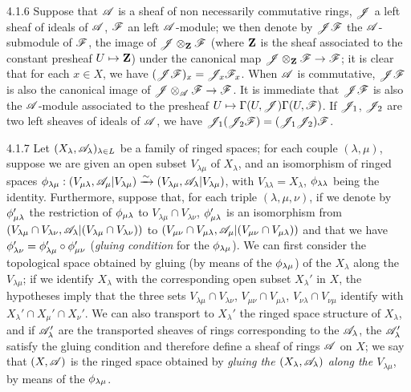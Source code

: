 \begin{env}{4.1.6}
\label{env-0.4.1.6}
Suppose that $\mathscr{A}$ is a sheaf of non necessarily commutative rings, $\mathscr{J}$
a left sheaf of ideals of $\mathscr{A}$, $\mathscr{F}$ an left $\mathscr{A}$-module; we then
denote by $\mathscr{J}\mathscr{F}$ the $\mathscr{A}$-submodule of $\mathscr{F}$, the image of
$\mathscr{J}\otimes_\mathbf{Z}\mathscr{F}$ (where $\mathbf{Z}$ is the sheaf associated to the
constant presheaf $U\mapsto\mathbf{Z}$) under the canonical map
$\mathscr{J}\otimes_\mathbf{Z}\mathscr{F}\to\mathscr{F}$; it is clear that for each $x\in X$, we
have $(\mathscr{J}\mathscr{F})_x=\mathscr{J}_x\mathscr{F}_x$. When $\mathscr{A}$ is commutative,
$\mathscr{J}\mathscr{F}$ is also the canonical image of
$\mathscr{J}\otimes_\mathscr{A}\mathscr{F}\to\mathscr{F}$. It is immediate that $\mathscr{J}\mathscr{F}$ is
also the $\mathscr{A}$-module associated to the presheaf
$U\mapsto\Gamma(U,\mathscr{J})\Gamma(U,\mathscr{F})$. If $\mathscr{J}_1$, $\mathscr{J}_2$ are two
left sheaves of ideals of $\mathscr{A}$, we have
$\mathscr{J}_1(\mathscr{J}_2\mathscr{F})=(\mathscr{J}_1\mathscr{J}_2)\mathscr{F}$.
\end{env}

\begin{env}{4.1.7}
\label{env-0.4.1.7}
Let $(X_\lambda,\mathscr{A}_\lambda)_{\lambda\in L}$ be a family of ringed spaces;
for each couple $(\lambda,\mu)$, suppose we are given an open subset
$V_{\lambda\mu}$ of $X_\lambda$, and an isomorphism of ringed spaces
$\phi_{\lambda\mu}:(V_{\mu\lambda},\mathscr{A}_\mu|V_{\lambda\mu})
  \xrightarrow{\sim}(V_{\lambda\mu},\mathscr{A}_\lambda|V_{\lambda\mu})$, with
$V_{\lambda\lambda}=X_\lambda$, $\phi_{\lambda\lambda}$ being the identity.
Furthermore, suppose that, for each triple $(\lambda,\mu,\nu)$, if we denote by
$\phi_{\mu\lambda}'$ the restriction of $\phi_{\mu\lambda}$ to
$V_{\lambda\mu}\cap V_{\lambda\nu}$, $\phi_{\mu\lambda}'$ is an isomorphism
from $(V_{\lambda\mu}\cap V_{\lambda\nu},
  \mathscr{A}_\lambda|(V_{\lambda\mu}\cap V_{\lambda\nu}))$ to
$(V_{\mu\nu}\cap V_{\mu\lambda},\mathscr{A}_\mu|(V_{\mu\nu}\cap V_{\mu\lambda}))$ and
that we have $\phi_{\lambda\nu}'=\phi_{\lambda\mu}'\circ\phi_{\mu\nu}'$
(\emph{gluing condition} for the $\phi_{\lambda\mu}$). We can first consider
the topological space obtained by gluing (by means of the $\phi_{\lambda\mu}$)
of the $X_\lambda$
along the $V_{\lambda\mu}$; if we identify $X_\lambda$ with the corresponding
open subset $X_\lambda'$ in $X$, the hypotheses imply that the three sets
$V_{\lambda\mu}\cap V_{\lambda\nu}$, $V_{\mu\nu}\cap V_{\mu\lambda}$,
$V_{\nu\lambda}\cap V_{\nu\mu}$ identify with
$X_\lambda'\cap X_\mu'\cap X_\nu'$. We can also transport to $X_\lambda'$ the
ringed space structure of $X_\lambda$, and if $\mathscr{A}_\lambda'$ are the
transported sheaves of rings corresponding to the $\mathscr{A}_\lambda$, the
$\mathscr{A}_\lambda'$ satisfy the gluing condition  and therefore
define a sheaf of rings $\mathscr{A}$ on $X$; we say that $(X,\mathscr{A})$ is the ringed
space obtained by \emph{gluing the $(X_\lambda,\mathscr{A}_\lambda)$ along the
$V_{\lambda\mu}$}, by means of the $\phi_{\lambda\mu}$.
\end{env}

